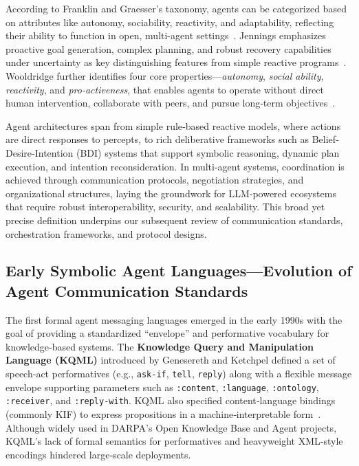 \documentclass{article}
\begin{document}
According to Franklin and Graesser’s taxonomy, agents can be categorized based on attributes like autonomy, sociability, reactivity, and adaptability, reflecting their ability to function in open, multi-agent settings~\cite{franklin1997taxonomy}.  Jennings emphasizes proactive goal generation, complex planning, and robust recovery capabilities under uncertainty as key distinguishing features from simple reactive programs~\cite{jennings2000agent}.  Wooldridge further identifies four core properties—\emph{autonomy}, \emph{social ability}, \emph{reactivity}, and \emph{pro‐activeness}, that enables agents to operate without direct human intervention, collaborate with peers, and pursue long‐term objectives~\cite{wooldridge2009introduction}.  

Agent architectures span from simple rule‐based reactive models, where actions are direct responses to percepts, to rich deliberative frameworks such as Belief‐Desire‐Intention (BDI) systems that support symbolic reasoning, dynamic plan execution, and intention reconsideration.  In multi-agent systems, coordination is achieved through communication protocols, negotiation strategies, and organizational structures, laying the groundwork for LLM‐powered ecosystems that require robust interoperability, security, and scalability.  This broad yet precise definition underpins our subsequent review of communication standards, orchestration frameworks, and protocol designs.


\subsection{Early Symbolic Agent Languages—Evolution of Agent Communication Standards}
The first formal agent messaging languages emerged in the early 1990s with the goal of providing a standardized “envelope” and performative vocabulary for knowledge‐based systems.  The \textbf{Knowledge Query and Manipulation Language (KQML)} introduced by Genesereth and Ketchpel defined a set of speech‐act performatives (e.g., \texttt{ask‐if}, \texttt{tell}, \texttt{reply}) along with a flexible message envelope supporting parameters such as \texttt{:content}, \texttt{:language}, \texttt{:ontology}, \texttt{:receiver}, and \texttt{:reply‐with}.  KQML also specified content‐language bindings (commonly KIF) to express propositions in a machine‐interpretable form~\cite{genesereth1993kqml,finin1994kqml}.  Although widely used in DARPA’s Open Knowledge Base and Agent projects, KQML’s lack of formal semantics for performatives and heavyweight XML‐style encodings hindered large‐scale deployments.
\end{document}
